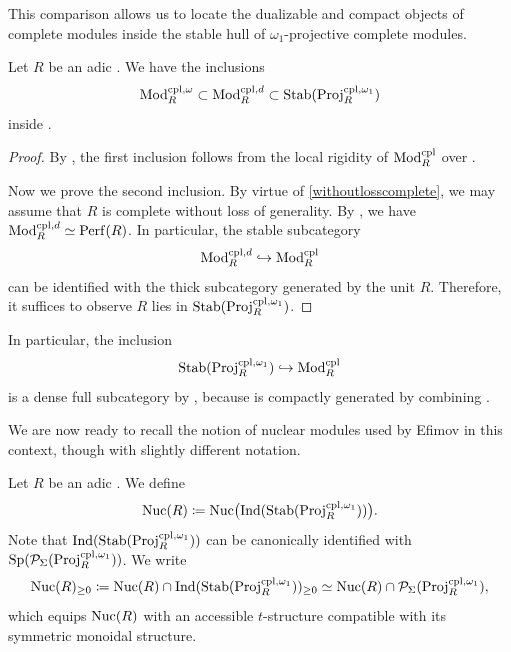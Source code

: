 \documentclass[a4paper,10pt, oneside]{amsart}
\begin{document}
	This comparison allows us to locate the dualizable and compact objects of complete modules inside the stable hull of  $\omega_1$-projective complete modules.
	\begin{prop}\label{modrcpldsubsetstab}
		Let $R$ be an adic \einfring.	We have the inclusions $$\operatorname{Mod}_R^{\mathrm{cpl},\omega}\subset \operatorname{Mod}_R^{\mathrm{cpl},d}\subset \mathrm{Stab}(\mathrm{Proj}_R^{\mathrm{cpl},\omega_1})$$ inside \modrcpl.
	\end{prop}
	\begin{proof}
		By \cite[Lemma 4.53]{ramzi2024locally}, the first inclusion follows from the local rigidity of $\mathrm{Mod}_{R}^{\mathrm{cpl}}$ over \opsp.
		
		Now we prove the second inclusion. By virtue of \cref{withoutlosscomplete}, we may assume that $R$ is complete without loss of generality.	By \cite[Theorem 11.3]{naumann2024separable}, we have $\operatorname{Mod}_R^{\mathrm{cpl},d}\simeq \mathrm{Perf}(R)$. In particular, the stable subcategory $$\operatorname{Mod}_R^{\mathrm{cpl},d}\hookrightarrow \mathrm{Mod}_{R}^{\mathrm{cpl}}$$ can be identified with the thick subcategory generated by the unit $R$. Therefore, it suffices to observe $R$ lies in  $\mathrm{Stab}(\mathrm{Proj}_R^{\mathrm{cpl},\omega_1})$.
	\end{proof}

	\begin{rem}
		In particular, the inclusion $$\mathrm{Stab}(\mathrm{Proj}_R^{\mathrm{cpl},\omega_1})\hookrightarrow \mathrm{Mod}_{R}^{\mathrm{cpl}}$$  is a dense full subcategory by \cite[Remark 20.4.1.11]{sag}, because \modrcpl is compactly generated by combining \cite[Proposition 7.1.1.12(e) and Proposition 7.3.1.7]{sag}.
	\end{rem}
	
We are now ready to recall the notion of nuclear modules used by Efimov \cite{efimov2025localizinginvariantsinverselimits} in this context, though with slightly different notation.

\begin{de}
	Let $R$ be an adic \einfring. We define
	\[
	\mathrm{Nuc}(R) \coloneq \mathrm{Nuc}\big(\mathrm{Ind}(\mathrm{Stab}(\mathrm{Proj}_R^{\mathrm{cpl},\omega_1}))\big).
	\]
	Note that $\mathrm{Ind}(\mathrm{Stab}(\mathrm{Proj}_R^{\mathrm{cpl},\omega_1}))$ can be canonically identified with $\mathrm{Sp}(\mathcal{P}_{\Sigma}(\mathrm{Proj}_R^{\mathrm{cpl},\omega_1}))$. We write
	\[
	\mathrm{Nuc}(R)_{\geq 0} \coloneq \mathrm{Nuc}(R) \cap \mathrm{Ind}(\mathrm{Stab}(\mathrm{Proj}_R^{\mathrm{cpl},\omega_1}))_{\geq 0}\simeq \mathrm{Nuc}(R) \cap\mathcal{P}_{\Sigma}(\mathrm{Proj}_R^{\mathrm{cpl},\omega_1}),
	\]
	which equips $\mathrm{Nuc}(R)$ with an accessible $t$-structure compatible with its symmetric monoidal structure.
\end{de}
\end{document}
